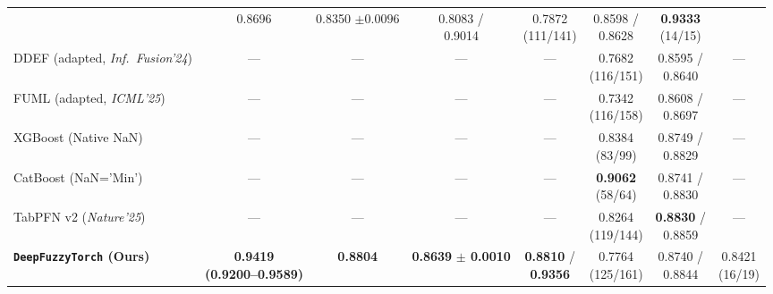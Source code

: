 \documentclass[10pt,twocolumn]{article}
\begin{document}
\begin{table}[t]
{\begin{tabular}{@{}>{\raggedright\arraybackslash}p{2.95cm}ccccccc@{}}
& 0.8696 & \shortstack{0.8350\\$\pm 0.0096$} & \shortstack{0.8083 /\\0.9014} &
\shortstack{0.7872\\(111/141)} & \shortstack{0.8598 /\\0.8628} &
\shortstack{\textbf{0.9333}\\(14/15)} \\
DDEF (adapted, \textit{Inf.\ Fusion'24}) \cite{shao2024dual} & --- & --- & --- & --- &
\shortstack{0.7682\\(116/151)} & \shortstack{0.8595 /\\0.8640} & --- \\
FUML (adapted, \textit{ICML'25}) \cite{duan2025fuml} & --- & --- & --- & --- &
\shortstack{0.7342\\(116/158)} & \shortstack{0.8608 /\\0.8697} & --- \\
XGBoost (Native NaN) \cite{chen2016xgboost} & --- & --- & --- & --- &
\shortstack{0.8384\\(83/99)} & \shortstack{0.8749 /\\0.8829} & --- \\
CatBoost (NaN='Min') \cite{prokhorenkova2018catboost} & --- & --- & --- & --- &
\shortstack{\textbf{0.9062}\\(58/64)} & \shortstack{0.8741 /\\0.8830} & --- \\
TabPFN v2 (\textit{Nature'25}) \cite{hollmann2025tabpfn} & --- & --- & --- & --- &
\shortstack{0.8264\\(119/144)} & \shortstack{\textbf{0.8830} /\\0.8859} & --- \\
\midrule
\textbf{\texttt{DeepFuzzyTorch} (Ours)} &
\shortstack{\textbf{0.9419}\\\textbf{(0.9200--0.9589)}} & \textbf{0.8804} &
\shortstack{\textbf{0.8639}\\\textbf{$\pm$ 0.0010}} & \shortstack{\textbf{0.8810}
/\\\textbf{0.9356}} & \shortstack{0.7764\\(125/161)} & \shortstack{0.8740 /\\0.8844} &
\shortstack{0.8421\\(16/19)} \\
\bottomrule
\end{tabular}%
}
\end{table}
\end{document}

